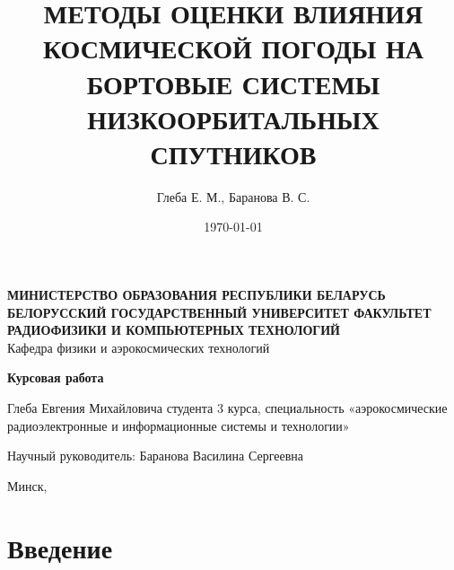 \documentclass[14pt, a4paper]{extreport}
\title{МЕТОДЫ ОЦЕНКИ ВЛИЯНИЯ КОСМИЧЕСКОЙ ПОГОДЫ НА БОРТОВЫЕ СИСТЕМЫ НИЗКООРБИТАЛЬНЫХ СПУТНИКОВ}
\author{Глеба Е. М., Баранова В. С.}
\date{\today}
\begin{document}
    \setlength{\headheight}{17.0pt}

    \begin{titlepage}
        \begin{center}
            \Large \textbf{МИНИСТЕРСТВО ОБРАЗОВАНИЯ РЕСПУБЛИКИ БЕЛАРУСЬ БЕЛОРУССКИЙ ГОСУДАРСТВЕННЫЙ УНИВЕРСИТЕТ ФАКУЛЬТЕТ РАДИОФИЗИКИ И КОМПЬЮТЕРНЫХ ТЕХНОЛОГИЙ
            } \\
            Кафедра физики и аэрокосмических технологий
        \end{center}

        \vspace{3em}

        \begin{center}
            \Huge \textbf{Курсовая работа}
        \end{center}

        \begin{center}
            \Large \thetitle
        \end{center}

        \vspace{1.5cm}

        \hfill
        \parbox{14em}{
            Глеба Евгения Михайловича \newline
            студента 3 курса, \newline
            специальность «аэрокосмические радиоэлектронные и информационные системы и технологии»

            \vspace{0.5cm}

            Научный руководитель: \newline
            Баранова Василина Сергеевна
        }

        \vspace{3cm}

        \begin{center}
            Минск, \the\year
        \end{center}

    \end{titlepage}

    \tableofcontents

    \newpage


    \section{Введение}
\end{document}
